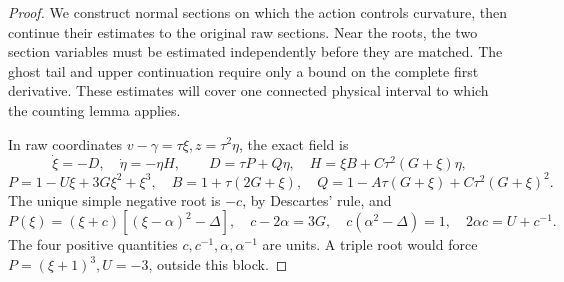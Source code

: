 \begin{proof}
We construct normal sections on which the action controls curvature,
then continue their estimates to the original raw sections. Near the
roots, the two section variables must be estimated independently before
they are matched. The ghost tail and upper continuation require only a
bound on the complete first derivative. These estimates will cover one
connected physical interval to which the counting lemma applies.

In raw coordinates \(v-\gamma=\tau\xi,z=\tau^2\eta\), the exact field is
\begin{equation}\label{deg:compact-cubic-field}
 \dot\xi=-D,\quad\dot\eta=-\eta H,\qquad
 D=\tau P+Q\eta,\quad H=\xi B+C\tau^2(G+\xi)\eta,
\end{equation}
\begin{equation}\label{deg:compact-cubic-polynomials}
 P=1-U\xi+3G\xi^2+\xi^3,\quad B=1+\tau(2G+\xi),\quad
 Q=1-A\tau(G+\xi)+C\tau^2(G+\xi)^2.
\end{equation}
The unique simple negative root is \(-c\), by Descartes' rule, and
\begin{equation}\label{deg:compact-factorization}
 P(\xi)=(\xi+c)[(\xi-\alpha)^2-\Delta],\quad
 c-2\alpha=3G,\quad c(\alpha^2-\Delta)=1,\quad
 2\alpha c=U+c^{-1}.
\end{equation}
The four positive quantities \(c,c^{-1},\alpha,\alpha^{-1}\) are units.
A triple root would force \(P=(\xi+1)^3,U=-3\), outside this block.


\end{proof}
